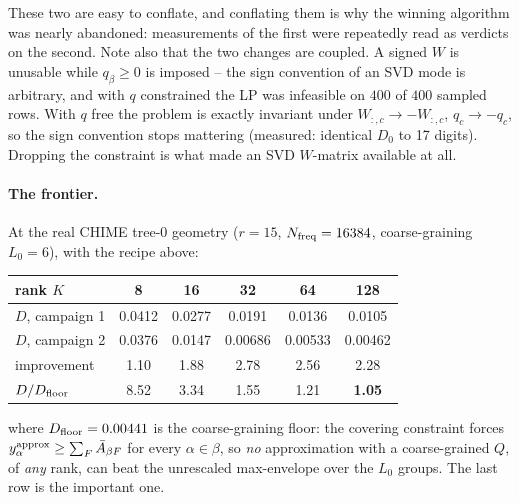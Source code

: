 \documentclass{article}
\numberwithin{equation}{section}   %
\begin{document}
\par\noindent
These two are easy to conflate, and conflating them is why the winning algorithm was nearly
abandoned: measurements of the first were repeatedly read as verdicts on the second. Note also
that the two changes are coupled. A signed $W$ is unusable while $q_\beta \ge 0$ is
imposed -- the sign convention of an SVD mode is arbitrary, and with $q$ constrained the LP was
infeasible on $400$ of $400$ sampled rows. With $q$ free the problem is exactly invariant under
$W_{:,c} \rightarrow -W_{:,c}$, $q_c \rightarrow -q_c$, so the sign convention stops mattering
(measured: identical $D_0$ to 17 digits). Dropping the constraint is what made an SVD $W$-matrix
available at all.

\paragraph{The frontier.}
At the real CHIME tree-0 geometry ($r=15$, $N_{\rm freq} = 16384$, coarse-graining $L_0 = 6$),
with the recipe above:

\begin{center}
\small
\begin{tabular}{lccccc}
\toprule
rank $K$ & 8 & 16 & 32 & 64 & 128 \\
\midrule
$D$, campaign 1        & 0.0412 & 0.0277  & 0.0191  & 0.0136  & 0.0105  \\
$D$, campaign 2        & 0.0376 & 0.0147  & 0.00686 & 0.00533 & 0.00462 \\
improvement            & 1.10   & 1.88    & 2.78    & 2.56    & 2.28    \\
$D/D_{\rm floor}$      & 8.52   & 3.34    & 1.55    & 1.21    & {\bf 1.05} \\
\bottomrule
\end{tabular}
\end{center}

\par\noindent
where $D_{\rm floor} = 0.00441$ is the coarse-graining floor: the covering constraint forces
$y^{\rm approx}_\alpha \ge \sum_F \bar A_{\beta F}$ for every $\alpha \in \beta$, so {\em no}
approximation with a coarse-grained $Q$, of {\em any} rank, can beat the unrescaled max-envelope over the
$L_0$ groups. The last row is the important one.
\end{document}
